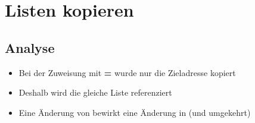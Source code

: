 \livecoding



\subtitle{Kapitel 5: ganz viele Variablen in einer}


\section{Listen kopieren}
\begin{frame}
    \slidehead
\end{frame}


\subsection{Analyse}
\begin{frame}
    \slidehead
    \vspace{2ex}
    \centering

    \vspace{2ex}
    \begin{itemize}
        \item Bei der Zuweisung mit \textbf{=} wurde nur die Zieladresse
            kopiert
        \item Deshalb wird die gleiche Liste referenziert
        \item Eine Änderung von  bewirkt eine Änderung in  (und umgekehrt)
    \end{itemize}
\end{frame}


